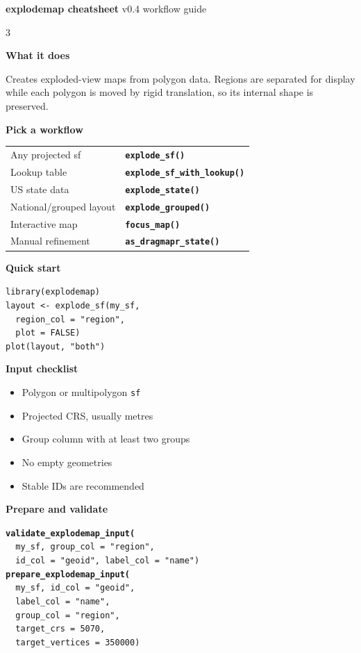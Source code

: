 \documentclass[9pt,landscape]{article}
\newcommand{\fn}[1]{\texttt{\footnotesize\bfseries\color{primary}#1}}
\newcommand{\code}[1]{\texttt{\footnotesize\color{ink}#1}}
\newcommand{\sectionbox}[1]{%
  \vspace{4pt}
  \colorbox{soft}{\parbox{\dimexpr\columnwidth-2\fboxsep}{\small\bfseries\color{primary}#1}}
  \vspace{2pt}
}
\begin{document}
\begin{center}
{\Large\bfseries\color{ink} explodemap cheatsheet}
\quad
{\small\color{primary} v0.4 workflow guide}
\end{center}
\vspace{-3pt}
\noindent{\color{primary}\rule{\textwidth}{1.2pt}}

\begin{multicols}{3}

\sectionbox{What it does}
{\footnotesize
Creates exploded-view maps from polygon data. Regions are separated for display
while each polygon is moved by rigid translation, so its internal shape is
preserved.
}

\sectionbox{Pick a workflow}
\begin{tabular}{@{}ll@{}}
{\footnotesize Any projected sf} & \fn{explode\_sf()} \\
{\footnotesize Lookup table} & \fn{explode\_sf\_with\_lookup()} \\
{\footnotesize US state data} & \fn{explode\_state()} \\
{\footnotesize National/grouped layout} & \fn{explode\_grouped()} \\
{\footnotesize Interactive map} & \fn{focus\_map()} \\
{\footnotesize Manual refinement} & \fn{as\_dragmapr\_state()} \\
\end{tabular}

\sectionbox{Quick start}
\code{library(explodemap)}\\
\code{layout <- explode\_sf(my\_sf,}\\
\code{\ \ region\_col = "region",}\\
\code{\ \ plot = FALSE)}\\
\code{plot(layout, "both")}

\sectionbox{Input checklist}
\begin{itemize}[leftmargin=*,nosep]
\item {\footnotesize Polygon or multipolygon \code{sf}}
\item {\footnotesize Projected CRS, usually metres}
\item {\footnotesize Group column with at least two groups}
\item {\footnotesize No empty geometries}
\item {\footnotesize Stable IDs are recommended}
\end{itemize}

\sectionbox{Prepare and validate}
\fn{validate\_explodemap\_input(}\\
\code{\ \ my\_sf, group\_col = "region",}\\
\code{\ \ id\_col = "geoid", label\_col = "name")}\\[2pt]
\fn{prepare\_explodemap\_input(}\\
\code{\ \ my\_sf, id\_col = "geoid",}\\
\code{\ \ label\_col = "name",}\\
\code{\ \ group\_col = "region",}\\
\code{\ \ target\_crs = 5070,}\\
\code{\ \ target\_vertices = 350000)}


\end{multicols}
\end{document}
